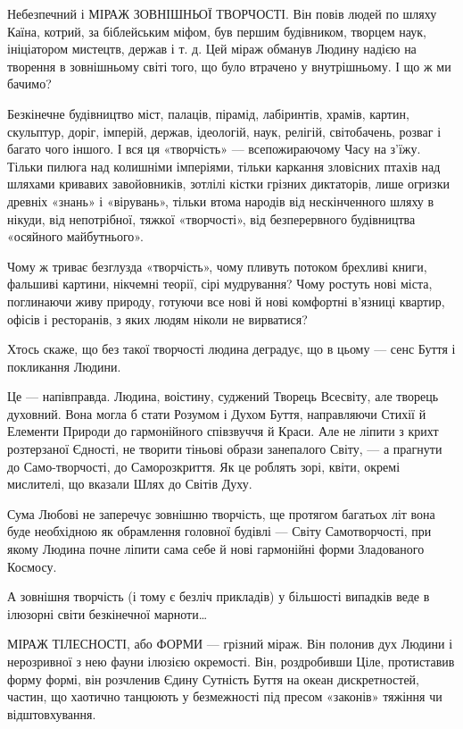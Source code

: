 Небезпечний і МІРАЖ ЗОВНІШНЬОЇ ТВОРЧОСТІ. Він повів людей по шляху Каїна,
котрий, за біблейським міфом, був першим будівником, творцем наук, ініціатором
мистецтв, держав і т. д. Цей міраж обманув Людину надією на творення в
зовнішньому світі того, що було втрачено у внутрішньому. І що ж ми бачимо?

Безкінечне будівництво міст, палаців, пірамід, лабіринтів, храмів, картин,
скульптур, доріг, імперій, держав, ідеологій, наук, релігій, світобачень,
розваг і багато чого іншого. І вся ця «творчість» — всепожираючому Часу на
з’їжу. Тільки пилюга над колишніми імперіями, тільки каркання зловісних птахів
над шляхами кривавих завойовників, зотлілі кістки грізних диктаторів, лише
огризки древніх «знань» і «вірувань», тільки втома народів від нескінченного
шляху в нікуди, від непотрібної, тяжкої «творчості», від безперервного
будівництва «осяйного майбутнього».

Чому ж триває безглузда «творчість», чому пливуть потоком брехливі книги,
фальшиві картини, нікчемні теорії, сірі мудрування? Чому ростуть нові міста,
поглинаючи живу природу, готуючи все нові й нові комфортні в’язниці квартир,
офісів і ресторанів, з яких людям ніколи не вирватися?

Хтось скаже, що без такої творчості людина деградує, що в цьому — сенс Буття і
покликання Людини.

Це — напівправда. Людина, воістину, суджений Творець Всесвіту, але творець
духовний. Вона могла б стати Розумом і Духом Буття, направляючи Стихії й
Елементи Природи до гармонійного співзвуччя й Краси. Але не ліпити з крихт
розтерзаної Єдності, не творити тіньові образи занепалого Світу, — а прагнути
до Само-творчості, до Саморозкриття. Як це роблять зорі, квіти, окремі
мислителі, що вказали Шлях до Світів Духу.

Сума Любові не заперечує зовнішню творчість, ще протягом багатьох літ вона буде
необхідною як обрамлення головної будівлі — Світу Самотворчості, при якому
Людина почне ліпити сама себе й нові гармонійні форми Зладованого Космосу.

А зовнішня творчість (і тому є безліч прикладів) у більшості випадків веде в
ілюзорні світи безкінечної марноти…

МІРАЖ ТІЛЕСНОСТІ, або ФОРМИ — грізний міраж. Він полонив дух Людини і
нерозривної з нею фауни ілюзією окремості. Він, роздробивши Ціле, протиставив
форму формі, він розчленив Єдину Сутність Буття на океан дискретностей, частин,
що хаотично танцюють у безмежності під пресом «законів» тяжіння чи
відштовхування.

